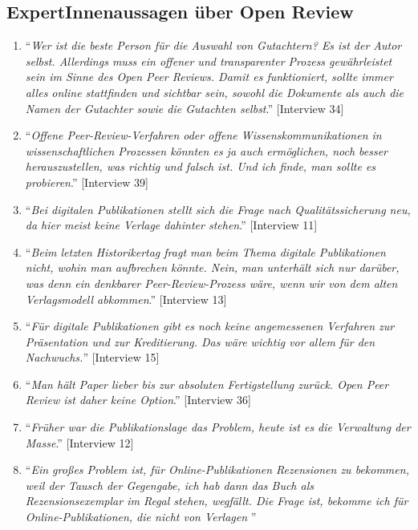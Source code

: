 \documentclass[a4paper,
fontsize=11pt,
oneside,
numbers=noperiodatend,
parskip=half-,
bibliography=totoc,
final
]{scrartcl}
\begin{document}
\subsection{ExpertInnenaussagen über Open
Review}\label{expertinnenaussagen-uxfcber-open-review}

\begin{enumerate}
\def\labelenumi{\arabic{enumi}.}
\item
  \enquote{\emph{Wer ist die beste Person für die Auswahl von
  Gutachtern? Es ist der Autor selbst. Allerdings muss ein offener und
  transparenter Prozess gewährleistet sein im Sinne des Open Peer
  Reviews. Damit es funktioniert, sollte immer alles online stattfinden
  und sichtbar sein, sowohl die Dokumente als auch die Namen der
  Gutachter sowie die Gutachten selbst}.} {[}Interview 34{]}
\item
  \enquote{\emph{Offene Peer-Review-Verfahren oder offene
  Wissenskommunikationen in wissenschaftlichen Prozessen könnten es ja
  auch ermöglichen, noch besser herauszustellen, was richtig und falsch
  ist. Und ich finde, man sollte es probieren}.} {[}Interview 39{]}
\item
  \enquote{\emph{Bei digitalen Publikationen stellt sich die Frage nach
  Qualitätssicherung neu, da hier meist keine Verlage dahinter stehen}.}
  {[}Interview 11{]}
\item
  \enquote{\emph{Beim letzten Historikertag fragt man beim Thema
  digitale Publikationen nicht, wohin man aufbrechen könnte. Nein, man
  unterhält sich nur darüber, was denn ein denkbarer Peer-Review-Prozess
  wäre, wenn wir von dem alten Verlagsmodell abkommen}.} {[}Interview
  13{]}
\item
  \enquote{\emph{Für digitale Publikationen gibt es noch keine
  angemessenen Verfahren zur Präsentation und zur Kreditierung. Das wäre
  wichtig vor allem für den Nachwuchs.}} {[}Interview 15{]}
\item
  \enquote{\emph{Man hält Paper lieber bis zur absoluten Fertigstellung
  zurück. Open Peer Review ist daher keine Option}.} {[}Interview 36{]}
\item
  \enquote{\emph{Früher war die Publikationslage das Problem, heute ist
  es die Verwaltung der Masse}.} {[}Interview 12{]}
\item
  \enquote{\emph{Ein großes Problem ist, für Online-Publikationen
  Rezensionen zu bekommen, weil der Tausch der Gegengabe, ich hab dann
  das Buch als Rezensionsexemplar im Regal stehen, wegfällt. Die Frage
  ist, bekomme ich für Online-Publikationen, die nicht von Verlagen
}}
\end{enumerate}
\end{document}
